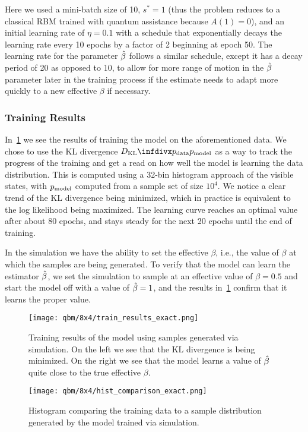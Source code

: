 Here we used a mini-batch size of 10, \( s^* = 1 \) (thus the problem reduces to a classical RBM trained with quantum assistance because \( A(1) = 0 \)), and an initial learning rate of \( \eta = 0.1 \) with a schedule that exponentially decays the learning rate every 10 epochs by a factor of 2 beginning at epoch 50.
The learning rate for the parameter \( \hat{\beta} \) follows a similar schedule, except it has a decay period of 20 as opposed to 10, to allow for more range of motion in the \( \hat{\beta} \) parameter later in the training process if the estimate needs to adapt more quickly to a new effective \( \beta \) if necessary.

\subsubsection{Training Results}
In~\cref{fig:train_results_exact} we see the results of training the model on the aforementioned data.
We chose to use the KL divergence \( \DKL{\pdata}{\pmodel} \) as a way to track the progress of the training and get a read on how well the model is learning the data distribution.
This is computed using a 32-bin histogram approach of the visible states, with \( p_{\text{model}} \) computed from a sample set of size \( 10^4 \).
We notice a clear trend of the KL divergence being minimized, which in practice is equivalent to the log likelihood being maximized.
The learning curve reaches an optimal value after about 80 epochs, and stays steady for the next 20 epochs until the end of training.

In the simulation we have the ability to set the effective \( \beta \), i.e., the value of \( \beta \) at which the samples are being generated.
To verify that the model can learn the estimator \( \hat{\beta} \), we set the simulation to sample at an effective value of \( \beta = 0.5 \) and start the model off with a value of \( \hat{\beta} = 1 \), and the results in~\cref{fig:train_results_exact} confirm that it learns the proper value.

\begin{figure}[!htb]
    \begin{center}
        \texttt{[image: qbm/8x4/train\_results\_exact.png]}
    \end{center}
    \caption{Training results of the model using samples generated via simulation. On the left we see that the KL divergence is being minimized. On the right we see that the model learns a value of \( \hat{\beta} \) quite close to the true effective \( \beta \).}
    \label{fig:train_results_exact}
\end{figure}
\begin{figure}[!htb]
    \begin{center}
        \texttt{[image: qbm/8x4/hist\_comparison\_exact.png]}
    \end{center}
    \caption{Histogram comparing the training data to a sample distribution generated by the model trained via simulation.}
    \label{fig:hist_comparison_exact}
\end{figure}

